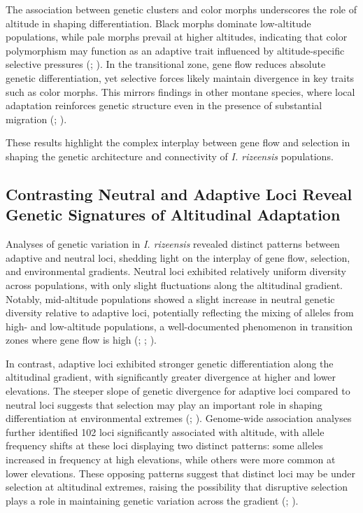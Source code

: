 \documentclass[9pt,a4paper,twoside]{rho-class/rho}
\begin{document}
        The association between genetic clusters and color morphs underscores the role of altitude in shaping differentiation. Black morphs dominate low-altitude populations, while pale morphs prevail at higher altitudes, indicating that color polymorphism may function as an adaptive trait influenced by altitude-specific selective pressures (\cite{AhnesjöForsman2006}; \cite{Sandoval1994}). In the transitional zone, gene flow reduces absolute genetic differentiation, yet selective forces likely maintain divergence in key traits such as color morphs. This mirrors findings in other montane species, where local adaptation reinforces genetic structure even in the presence of substantial migration (\cite{Orsini2013}; \cite{Sexton2014}).
        
        These results highlight the complex interplay between gene flow and selection in shaping the genetic architecture and connectivity of \textit{I. rizeensis} populations.

    \subsection{Contrasting Neutral and Adaptive Loci Reveal Genetic Signatures of Altitudinal Adaptation}
 
        Analyses of genetic variation in \textit{I. rizeensis} revealed distinct patterns between adaptive and neutral loci, shedding light on the interplay of gene flow, selection, and environmental gradients. Neutral loci exhibited relatively uniform diversity across populations, with only slight fluctuations along the altitudinal gradient. Notably, mid-altitude populations showed a slight increase in neutral genetic diversity relative to adaptive loci, potentially reflecting the mixing of alleles from high- and low-altitude populations, a well-documented phenomenon in transition zones where gene flow is high (\cite{Byars2009}; \cite{Polato2017}; \cite{Cortázar-Chinarro2017}).

        In contrast, adaptive loci exhibited stronger genetic differentiation along the altitudinal gradient, with significantly greater divergence at higher and lower elevations. The steeper slope of genetic divergence for adaptive loci compared to neutral loci suggests that selection may play an important role in shaping differentiation at environmental extremes (\cite{Raeymaekers2017}; \cite{Cortázar-Chinarro2017}). Genome-wide association analyses further identified 102 loci significantly associated with altitude, with allele frequency shifts at these loci displaying two distinct patterns: some alleles increased in frequency at high elevations, while others were more common at lower elevations. These opposing patterns suggest that distinct loci may be under selection at altitudinal extremes, raising the possibility that disruptive selection plays a role in maintaining genetic variation across the gradient (\cite{White2021}; \cite{Wadgymar2022}).
\end{document}
